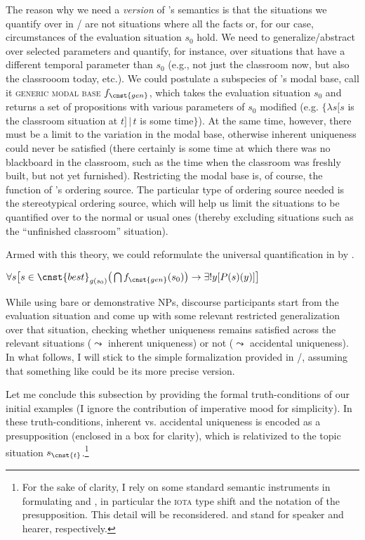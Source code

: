 \documentclass[output=paper,colorlinks,citecolor=brown,newtxmath]{langscibook}
\begin{document}
\noindent The reason why we need a \textit{version} of \citeauthor{Kratzer1981}'s semantics is that the situations we quantify over in / are not situations where all the facts or, for our case, circumstances of the evaluation situation $s_0$ hold. We need to generalize/abstract over selected parameters and quantify, for instance, over situations that have a different temporal parameter than $s_0$ (e.g., not just the classroom now, but also the classrooom today, etc.). We could postulate a subspecies of \citeauthor{Kratzer1981}'s modal base, call it \textsc{generic modal base} $f_{\cnst{gen}}$, which takes the evaluation situation $s_0$ and returns a set of propositions with various parameters of $s_0$ modified (e.g. $\{\lambda s[s$ is the classroom situation at $t]\,\vert\,t$ is some time$\}$). At the same time, however, there must be a limit to the variation in the modal base, otherwise inherent uniqueness could never be satisfied (there certainly is some time at which there was no blackboard in the classroom, such as the time when the classroom was freshly built, but not yet furnished). Restricting the modal base is, of course, the function of \citeauthor{Kratzer1981}'s ordering source. The particular type of ordering source needed is the stereotypical ordering source, which will help us limit the situations to be quantified over to the normal or usual ones (thereby excluding situations such as the ``unfinished classroom'' situation).

Armed with this theory, we could reformulate the universal quantification in  by .

\ea $\forall s\big[s\in\cnst{best}_{g(s_0)}\big(\bigcap f_{\cnst{gen}}(s_0)\big)\rightarrow \exists!y[P(s)(y)]\big]$
\label{simik:def:modal}
\z

\noindent While using bare or demonstrative NPs, discourse participants start from the evaluation situation and come up with some relevant restricted generalization over that situation, checking whether uniqueness remains satisfied across the relevant situations ($\leadsto$ inherent uniqueness) or not ($\leadsto$ accidental uniqueness). In what follows, I will stick to the simple formalization provided in /, assuming that something like  could be its more precise version.

Let me conclude this subsection by providing the formal truth-conditions of our initial examples (I ignore the contribution of imperative mood for simplicity). In these truth-conditions, inherent vs. accidental uniqueness is encoded as a presupposition (enclosed in a box for clarity), which is relativized to the topic situation $s_{\cnst{t}}$.\footnote{For the sake of clarity, I rely on some standard semantic instruments in formulating  and , in particular the \textsc{iota} type shift \citep{Partee1987} and the notation of the presupposition. This detail will be reconsidered.  and  stand for speaker and hearer, respectively.}
\end{document}
